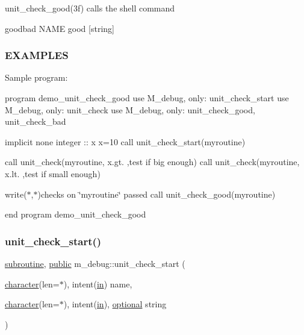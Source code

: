 \begin{DoxyVerb}unit_check_good(3f) calls the shell command

     goodbad NAME good [string]
\end{DoxyVerb}


\subsubsection*{E\+X\+A\+M\+P\+L\+ES}

Sample program\+:

program demo\+\_\+unit\+\_\+check\+\_\+good use M\+\_\+debug, only\+: unit\+\_\+check\+\_\+start use M\+\_\+debug, only\+: unit\+\_\+check use M\+\_\+debug, only\+: unit\+\_\+check\+\_\+good, unit\+\_\+check\+\_\+bad

implicit none integer \+:\+: x x=10 call unit\+\_\+check\+\_\+start(\textquotesingle{}myroutine\textquotesingle{})

call unit\+\_\+check(\textquotesingle{}myroutine\textquotesingle{}, x.\+gt. ,\textquotesingle{}test if big enough\textquotesingle{}) call unit\+\_\+check(\textquotesingle{}myroutine\textquotesingle{}, x.\+lt. ,\textquotesingle{}test if small enough\textquotesingle{})

write($\ast$,$\ast$)\textquotesingle{}checks on \char`\"{}myroutine\char`\"{} passed\textquotesingle{} call unit\+\_\+check\+\_\+good(\textquotesingle{}myroutine\textquotesingle{})

end program demo\+\_\+unit\+\_\+check\+\_\+good \mbox{\label{namespacem__debug_a6f1166b1f25f39931359c1aa1b2219e5}} 
\subsubsection{\texorpdfstring{unit\+\_\+check\+\_\+start()}{unit\_check\_start()}}
{\footnotesize\ttfamily \hyperlink{M__stopwatch_83_8txt_acfbcff50169d691ff02d4a123ed70482}{subroutine}, \hyperlink{M__stopwatch_83_8txt_a2f74811300c361e53b430611a7d1769f}{public} m\+\_\+debug\+::unit\+\_\+check\+\_\+start (\begin{DoxyParamCaption}\item[{\hyperlink{option__stopwatch_83_8txt_abd4b21fbbd175834027b5224bfe97e66}{character}(len=$\ast$), intent(\hyperlink{M__journal_83_8txt_afce72651d1eed785a2132bee863b2f38}{in})}]{name,  }\item[{\hyperlink{option__stopwatch_83_8txt_abd4b21fbbd175834027b5224bfe97e66}{character}(len=$\ast$), intent(\hyperlink{M__journal_83_8txt_afce72651d1eed785a2132bee863b2f38}{in}), \hyperlink{option__stopwatch_83_8txt_aa4ece75e7acf58a4843f70fe18c3ade5}{optional}}]{string }\end{DoxyParamCaption})}




